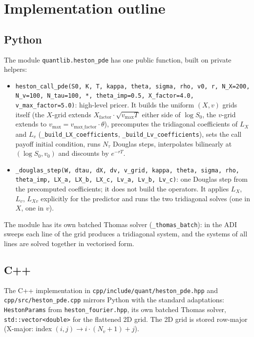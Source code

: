 \documentclass[11pt]{article}
\theoremstyle{plain}
\theoremstyle{definition}
\theoremstyle{remark}
\begin{document}
\section{Implementation outline}

\subsection{Python}

The module \texttt{quantlib.heston\_pde} has one public function, built on private helpers:

\begin{itemize}[topsep=2pt]\raggedright
    \item \texttt{heston\_call\_pde(S0, K, T, kappa, theta, sigma, rho, v0, r, N\_X=200, N\_v=100, N\_tau=100, *, theta\_imp=0.5, X\_factor=4.0, v\_max\_factor=5.0)}: high-level pricer. It builds the uniform $(X, v)$ grids itself (the $X$-grid extends $X_{\mathrm{factor}} \cdot \sqrt{v_{\max} T}$ either side of $\log S_0$, the $v$-grid extends to $v_{\max} = v_{\mathrm{max\_factor}} \cdot \theta$), precomputes the tridiagonal coefficients of $L_X$ and $L_v$ (\texttt{\_build\_LX\_coefficients}, \texttt{\_build\_Lv\_coefficients}), sets the call payoff initial condition, runs $N_\tau$ Douglas steps, interpolates bilinearly at $(\log S_0, v_0)$ and discounts by $e^{-rT}$.
    \item \texttt{\_douglas\_step(W, dtau, dX, dv, v\_grid, kappa, theta, sigma, rho, theta\_imp, LX\_a, LX\_b, LX\_c, Lv\_a, Lv\_b, Lv\_c)}: one Douglas step from the precomputed coefficients; it does not build the operators. It applies $L_X$, $L_v$, $L_{Xv}$ explicitly for the predictor and runs the two tridiagonal solves (one in $X$, one in $v$).
\end{itemize}

The module has its own batched Thomas solver (\texttt{\_thomas\_batch}): in the ADI sweeps each line of the grid produces a tridiagonal system, and the systems of all lines are solved together in vectorised form.

\subsection{C++}

The C++ implementation in \texttt{cpp/include/quant/heston\_pde.hpp} and \texttt{cpp/src/heston\_pde.cpp} mirrors Python with the standard adaptations: \texttt{HestonParams} from \texttt{heston\_fourier.hpp}, its own batched Thomas solver, \texttt{std::vector<double>} for the flattened 2D grid. The 2D grid is stored row-major (X-major: index $(i, j) \to i \cdot (N_v + 1) + j$).
\end{document}
